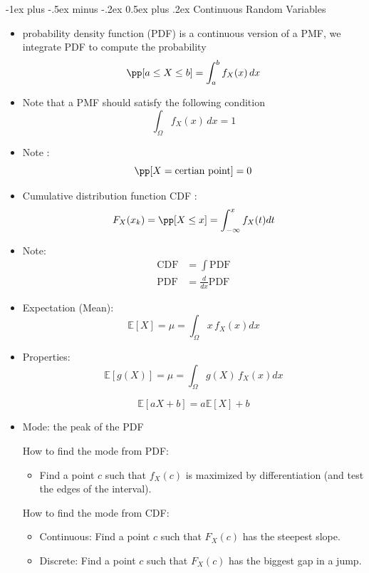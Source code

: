 \documentclass[10pt,landscape]{article}
\makeatletter
\renewcommand{\section}{\@startsection{section}{1}{0mm}%
                                {-1ex plus -.5ex minus -.2ex}%
                                {0.5ex plus .2ex}%
                                {\normalfont\large\bfseries}}
\makeatother
\begin{document}
\begin{multicols*}{3}
\begin{itemize}
\end{itemize}

\section{Continuous Random Variables}
\begin{itemize}

\item  probability density function (PDF) is a continuous version of a PMF, we integrate PDF to compute the probability
$$ \pp[a\leq X \leq b] = \int_a^b f_X(x) \, dx $$



\item Note that a PMF should satisfy the following condition 
$$\int_{\Omega} f_X(x)\, dx = 1 $$

\item Note : 
$$\pp[X=\text{certian point} ] = 0 $$

\item Cumulative distribution function CDF  :
$$ F_X(x_k) = \pp[X \leq x] = \int_{-\infty}^x f_X(t) dt $$

\item Note:
\begin{align*}
\text{CDF} &= \int \text{PDF}\\
\text{PDF} &= \frac{d}{dx} \text{PDF}
\end{align*}


\item Expectation (Mean):
$$ \mathbb{E}[X] = \mu =\int_{\Omega} x\,f_X(x) dx  $$

\item Properties:
$$ \mathbb{E}[g(X)] = \mu =\int_{\Omega} g(X)\,f_X(x) dx  $$


$$\mathbb{E}[aX+b] =a\mathbb{E}[X]+b $$

\item Mode: the peak of the PDF

How to find the mode from PDF:
\begin{itemize}
    \item Find a point \(c\) such that \(f_X(c)\) is maximized by differentiation (and test the edges of the interval).
\end{itemize}

How to find the mode from CDF:
\begin{itemize}
    \item Continuous: Find a point \(c\) such that \(F_X(c)\) has the steepest slope.
    \item Discrete: Find a point \(c\) such that \(F_X(c)\) has the biggest gap in a jump.
\end{itemize}



\end{itemize}
\end{multicols*}
\end{document}
